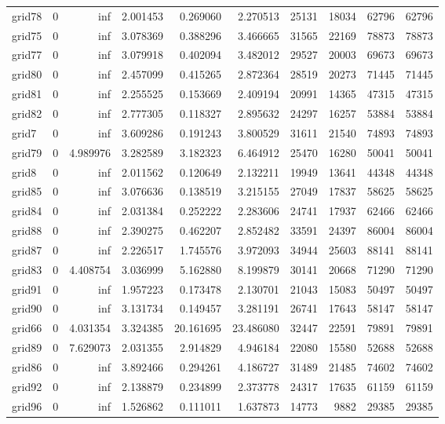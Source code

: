 \begin{longtable}{|l|r|r|r|r|r|r|r|r|r|}
grid78 & 0 & inf & 2.001453 & 0.269060 & 2.270513 & 25131 & 18034 & 62796 & 62796 \\
grid75 & 0 & inf & 3.078369 & 0.388296 & 3.466665 & 31565 & 22169 & 78873 & 78873 \\
grid77 & 0 & inf & 3.079918 & 0.402094 & 3.482012 & 29527 & 20003 & 69673 & 69673 \\
grid80 & 0 & inf & 2.457099 & 0.415265 & 2.872364 & 28519 & 20273 & 71445 & 71445 \\
grid81 & 0 & inf & 2.255525 & 0.153669 & 2.409194 & 20991 & 14365 & 47315 & 47315 \\
grid82 & 0 & inf & 2.777305 & 0.118327 & 2.895632 & 24297 & 16257 & 53884 & 53884 \\
grid7 & 0 & inf & 3.609286 & 0.191243 & 3.800529 & 31611 & 21540 & 74893 & 74893 \\
grid79 & 0 & 4.989976 & 3.282589 & 3.182323 & 6.464912 & 25470 & 16280 & 50041 & 50041 \\
grid8 & 0 & inf & 2.011562 & 0.120649 & 2.132211 & 19949 & 13641 & 44348 & 44348 \\
grid85 & 0 & inf & 3.076636 & 0.138519 & 3.215155 & 27049 & 17837 & 58625 & 58625 \\
grid84 & 0 & inf & 2.031384 & 0.252222 & 2.283606 & 24741 & 17937 & 62466 & 62466 \\
grid88 & 0 & inf & 2.390275 & 0.462207 & 2.852482 & 33591 & 24397 & 86004 & 86004 \\
grid87 & 0 & inf & 2.226517 & 1.745576 & 3.972093 & 34944 & 25603 & 88141 & 88141 \\
grid83 & 0 & 4.408754 & 3.036999 & 5.162880 & 8.199879 & 30141 & 20668 & 71290 & 71290 \\
grid91 & 0 & inf & 1.957223 & 0.173478 & 2.130701 & 21043 & 15083 & 50497 & 50497 \\
grid90 & 0 & inf & 3.131734 & 0.149457 & 3.281191 & 26741 & 17643 & 58147 & 58147 \\
grid66 & 0 & 4.031354 & 3.324385 & 20.161695 & 23.486080 & 32447 & 22591 & 79891 & 79891 \\
grid89 & 0 & 7.629073 & 2.031355 & 2.914829 & 4.946184 & 22080 & 15580 & 52688 & 52688 \\
grid86 & 0 & inf & 3.892466 & 0.294261 & 4.186727 & 31489 & 21485 & 74602 & 74602 \\
grid92 & 0 & inf & 2.138879 & 0.234899 & 2.373778 & 24317 & 17635 & 61159 & 61159 \\
grid96 & 0 & inf & 1.526862 & 0.111011 & 1.637873 & 14773 & 9882 & 29385 & 29385 \\

\end{longtable}
